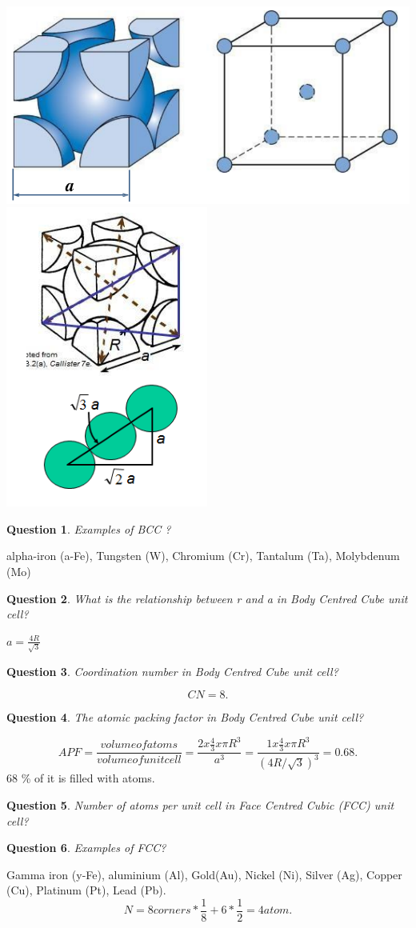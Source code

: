 \documentclass[13]{article}
\newtheorem{exer}{Question}
\begin{document}
\begin{center}
\includegraphics[scale=0.5]{figures/8.png} \includegraphics[scale=0.5]{figures/9.png}
\end{center}

\begin{exer}
Examples of BCC ?
\end{exer}
alpha-iron (a-Fe), Tungsten (W), Chromium (Cr), Tantalum (Ta), Molybdenum (Mo)
\begin{exer}
What is the relationship between r and a in Body Centred Cube unit cell?
\end{exer}
$a = \frac{4R}{\sqrt{3}}$
\begin{exer}
Coordination number in Body Centred Cube unit cell?
\end{exer}
\[
CN=8
.\] 
\begin{exer}
The atomic packing factor in Body Centred Cube unit cell?
\end{exer}
\[
	APF = \frac{volume of atoms}{volume of unit cell} = \frac{2x \frac{4}{3} x \pi R^3}{a^3}= \frac{1x \frac{4}{3} x \pi R^3}{(4R/\sqrt{3})^3}= 0.68
.\] 
68 \% of it is filled with atoms. 
\begin{exer} Number of atoms per unit cell in Face Centred Cubic (FCC) unit cell?
\end{exer}
\begin{exer}
Examples of FCC?
\end{exer}
Gamma iron (y-Fe), aluminium (Al), Gold(Au), Nickel (Ni), Silver (Ag), Copper (Cu), Platinum (Pt), Lead (Pb). 
\[
N = 8 corners * \frac{1}{8} + 6* \frac{1}{2}  = 4 atom 
.\]
\end{document}
